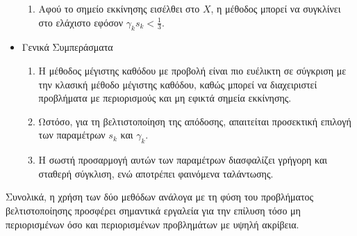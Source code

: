 \documentclass[a4paper,12pt]{article}
\begin{document}
\begin{itemize}
\begin{enumerate}
        \item Αφού το σημείο εκκίνησης εισέλθει στο $X$, η μέθοδος μπορεί να συγκλίνει στο ελάχιστο εφόσον 
        $\gamma_k s_k < \frac{1}{3}$.
    \end{enumerate}
    \item Γενικά Συμπεράσματα
    \begin{enumerate}
        \item Η μέθοδος μέγιστης καθόδου με προβολή είναι πιο ευέλικτη σε σύγκριση με την κλασική μέθοδο μέγιστης 
        καθόδου, καθώς μπορεί να διαχειριστεί προβλήματα με περιορισμούς και μη εφικτά σημεία εκκίνησης.
        \item Ωστόσο, για τη βελτιστοποίηση της απόδοσης, απαιτείται προσεκτική επιλογή των παραμέτρων $s_k$ και 
        $\gamma_k$.
        \item Η σωστή προσαρμογή αυτών των παραμέτρων διασφαλίζει γρήγορη και σταθερή σύγκλιση, ενώ αποτρέπει 
        φαινόμενα ταλάντωσης.
    \end{enumerate}
\end{itemize}

Συνολικά, η χρήση των δύο μεθόδων ανάλογα με τη φύση του προβλήματος βελτιστοποίησης προσφέρει σημαντικά εργαλεία 
για την επίλυση τόσο μη περιορισμένων όσο και περιορισμένων προβλημάτων με υψηλή ακρίβεια.
\end{document}
